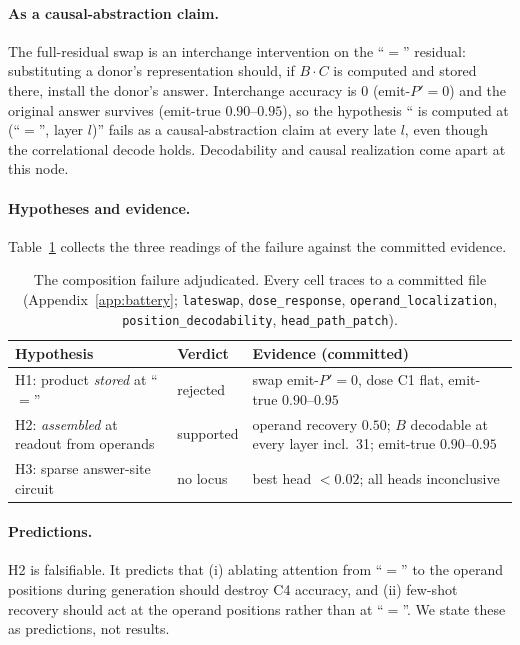 \paragraph{As a causal-abstraction claim.}
The full-residual swap is an interchange intervention \citep{geiger-etal-2021-causal} on the
``$=$'' residual: substituting a donor's representation should, if $B\!\cdot\!C$ is computed and
stored there, install the donor's answer. Interchange accuracy is $0$ (emit-$P'=0$) and the
original answer survives (emit-true $0.90$--$0.95$), so the hypothesis ``\bc{} is computed at
(``$=$'', layer $l$)'' fails as a causal-abstraction claim at every late $l$, even though the
correlational decode holds. Decodability and causal realization come apart at this node.

\paragraph{Hypotheses and evidence.}
Table~\ref{tab:hyp} collects the three readings of the failure against the committed evidence.

\begin{table}[t]
\centering
\footnotesize
\setlength{\tabcolsep}{3pt}
\begin{tabular}{@{}p{2.35cm}p{1.15cm}p{3.1cm}@{}}
\toprule
Hypothesis & Verdict & Evidence (committed) \\
\midrule
H1: product \emph{stored} at ``$=$'' & rejected & swap emit-$P'{=}0$, dose C1 flat, emit-true $0.90$--$0.95$ \\
H2: \emph{assembled} at readout from operands & supported & operand recovery $0.50$; $B$ decodable at every layer incl.\ 31; emit-true $0.90$--$0.95$ \\
H3: sparse answer-site circuit & no locus & best head $<0.02$; all heads inconclusive \\
\bottomrule
\end{tabular}
\caption{The composition failure adjudicated. Every cell traces to a committed file
(Appendix~\ref{app:battery}; \texttt{lateswap}, \texttt{dose\_response},
\texttt{operand\_localization}, \texttt{position\_decodability}, \texttt{head\_path\_patch}).}
\label{tab:hyp}
\end{table}

\paragraph{Predictions.}
H2 is falsifiable. It predicts that (i) ablating attention from ``$=$'' to the operand positions
during generation should destroy C4 accuracy, and (ii) few-shot recovery should act at the operand
positions rather than at ``$=$''. We state these as predictions, not results.
